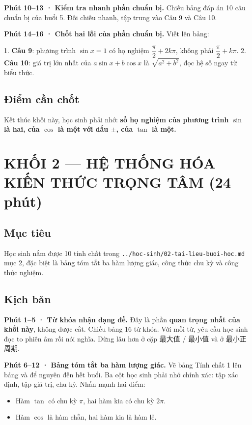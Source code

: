 \documentclass[11pt, a4paper]{article}
\begin{document}
\textbf{Phút 10–13 · Kiểm tra nhanh phần chuẩn bị.} Chiếu bảng đáp án 10 câu chuẩn bị của buổi 5. Đối chiếu nhanh, tập trung vào Câu 9 và Câu 10.

\textbf{Phút 14–16 · Chốt hai lỗi của phần chuẩn bị.} Viết lên bảng:

1. \textbf{Câu 9}: phương trình $\sin x = 1$ có họ nghiệm $\dfrac{\pi}{2} + 2k\pi$, không phải $\dfrac{\pi}{2} + k\pi$.
2. \textbf{Câu 10}: giá trị lớn nhất của $a\sin x + b\cos x$ là $\sqrt{a^2 + b^2}$, đọc hệ số ngay từ biểu thức.

\subsection{Điểm cần chốt}

Kết thúc khối này, học sinh phải nhớ: \textbf{số họ nghiệm của phương trình $\sin$ là hai, của $\cos$ là một với dấu $\pm$, của $\tan$ là một.}

\section{KHỐI 2 — HỆ THỐNG HÓA KIẾN THỨC TRỌNG TÂM (24 phút)}

\subsection{Mục tiêu}

Học sinh nắm được 10 tính chất trong \texttt{../hoc-sinh/02-tai-lieu-buoi-hoc.md} mục 2, đặc biệt là bảng tóm tắt ba hàm lượng giác, công thức chu kỳ và công thức nghiệm.

\subsection{Kịch bản}

\textbf{Phút 1–5 · Từ khóa nhận dạng đề.} Đây là phần \textbf{quan trọng nhất của khối này}, không được cắt. Chiếu bảng 16 từ khóa. Với mỗi từ, yêu cầu học sinh đọc to phiên âm rồi nói nghĩa. Dừng lâu hơn ở cặp 最大值 / 最小值 và ở 最小正周期.

\textbf{Phút 6–12 · Bảng tóm tắt ba hàm lượng giác.} Vẽ bảng Tính chất 1 lên bảng và để nguyên đến hết buổi. Ba cột học sinh phải nhớ chính xác: tập xác định, tập giá trị, chu kỳ. Nhấn mạnh hai điểm:

\begin{itemize}[leftmargin=1.4em, itemsep=2pt]
\item Hàm $\tan$ có chu kỳ $\pi$, hai hàm kia có chu kỳ $2\pi$.
\item Hàm $\cos$ là hàm chẵn, hai hàm kia là hàm lẻ.
\end{itemize}
\end{document}
